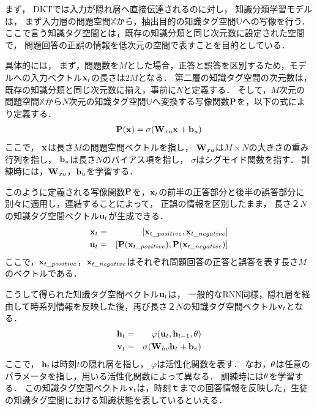 まず，
DKTでは入力が隠れ層へ直接伝達されるのに対し，
知識分類学習モデルは，
まず入力層の問題空間$\mathbb{X}$から，抽出目的の知識タグ空間$\mathbb{U}$への写像を行う．
ここで言う知識タグ空間とは，既存の知識分類と同じ次元数に設定された空間で，
問題回答の正誤の情報を低次元の空間で表すことを目的としている．

具体的には，
まず，問題数を$M$とした場合，正答と誤答を区別するため，モデルへの入力ベクトル${\bf x}_t$の長さは$2M$となる．
第二層の知識タグ空間の次元数は，既存の知識分類と同じ次元数に揃え，事前に$N$と定義する．
そして，$M$次元の問題空間$\mathbb{X}$から$N$次元の知識タグ空間$\mathbb{U}$へ変換する写像関数${\bf P}$を，以下の式により定義する．
\begin{eqnarray}
{\bf P({\bf x})} = \sigma( {\bf W}_{xu} {\bf x} + {\bf b}_u)
\end{eqnarray}
ここで，
${\bf x}$は長さ$M$の問題空間ベクトルを指し，
${\bf W}_{xu}$は$M \times N$の大きさの重み行列を指し，
${\bf b}_u$は長さ$N$のバイアス項を指し，
$\sigma$はシグモイド関数を指す．
訓練時には，${\bf W}_{xu}$，${\bf b}_u$を学習する．

このように定義される写像関数${\bf P}$を，${\bf x}_t$の前半の正答部分と後半の誤答部分に別々に適用し，連結することによって，
正誤の情報を区別したまま，
長さ$２N$の知識タグ空間ベクトル${\bf u}_t$が生成できる．
\begin{eqnarray}
{\bf x}_t &=& [{\bf x}_{t\_positive}, {\bf x}_{t\_negative}]\\
{\bf u}_t &=& [{\bf P}({\bf x}_{t\_positive}), {\bf P}({\bf x}_{t\_negative})]
\end{eqnarray}
ここで，${\bf x}_{t\_positive}$，${\bf x}_{t\_negative}$はそれぞれ問題回答の正答と誤答を表す長さ$M$のベクトルである．

こうして得られた知識タグ空間ベクトル${\bf u}_t$は，
一般的なRNN同様，隠れ層を経由して時系列情報を反映した後，再び長さ$２N$の知識タグ空間ベクトル${\bf v}_t$となる．
\begin{eqnarray}
{\bf h}_t &=& \varphi({\bf u}_t, {\bf h}_{t-1}, {\bf \theta})\\
{\bf v}_t &=& \sigma( {\bf W}_{hv} {\bf h}_t + {\bf b}_v)
\end{eqnarray}
ここで，
${\bf h}_t$は時刻$t$の隠れ層を指し，
$\varphi$は活性化関数を表す．
なお，${\bf \theta}$は任意のパラメータを指し，用いる活性化関数によって異なる．
訓練時には${\bf \theta}$を学習する．
この知識タグ空間ベクトル${\bf v}_t$は，時刻$ｔ$までの回答情報を反映した，生徒の知識タグ空間における知識状態を表しているといえる．

